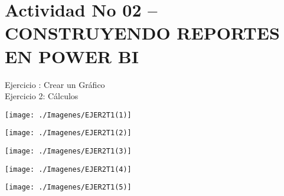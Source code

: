 \section{Actividad No 02 – CONSTRUYENDO REPORTES EN POWER BI} 

Ejercicio :  Crear un Gráfico \\
Ejercicio 2: Cálculos \\

	\begin{center}
	\texttt{[image: ./Imagenes/EJER2T1(1)]}
	\end{center}	

	\begin{center}
	\texttt{[image: ./Imagenes/EJER2T1(2)]}
	\end{center}	

	\begin{center}
	\texttt{[image: ./Imagenes/EJER2T1(3)]}
	\end{center}	

	\begin{center}
	\texttt{[image: ./Imagenes/EJER2T1(4)]}
	\end{center}	
\newpage
	\begin{center}
	\texttt{[image: ./Imagenes/EJER2T1(5)]}
	\end{center}	

	
